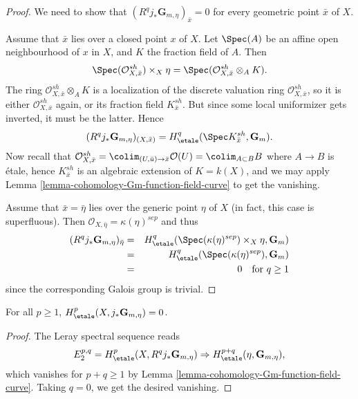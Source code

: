 \begin{proof}
We need to show that $(R^q j_*\mathbf{G}_{m, \eta})_{\bar x} = 0$ for every
geometric point $\bar x$ of $X$.

\medskip\noindent
Assume that $\bar x$ lies over a closed point $x$ of $X$. Let $\Spec(A)$
be an affine open neighbourhood of $x$ in $X$, and $K$ the fraction field
of $A$. Then
$$
\Spec(\mathcal{O}^{sh}_{X, \bar x}) \times_X \eta =
\Spec(\mathcal{O}^{sh}_{X, \bar x} \otimes_A K).
$$
The ring $\mathcal{O}^{sh}_{X, \bar x} \otimes_A K$ is a localization of
the discrete valuation ring $\mathcal{O}^{sh}_{X, \bar x}$, so it is either
$\mathcal{O}^{sh}_{X, \bar x}$ again, or its fraction field
$K^{sh}_{\bar x}$. But since some local uniformizer gets inverted, it must
be the latter. Hence
$$
(R^q j_*\mathbf{G}_{m, \eta})_{(X, \bar x)} = H_\etale^q(\Spec
K^{sh}_{\bar x}, \mathbf{G}_m).
$$
Now recall that $\mathcal{O}^{sh}_{X, \bar x} =
\colim_{(U, \bar u) \to \bar x} \mathcal{O}(U) = \colim_{A \subset B} B$
where $A \to B$ is \'etale, hence $K^{sh}_{\bar x}$ is an algebraic
extension of $K = k(X)$, and we may apply
Lemma \ref{lemma-cohomology-Gm-function-field-curve}
to get the vanishing.

\medskip\noindent
Assume that $\bar x = \bar \eta$ lies over the generic point $\eta$ of $X$ (in
fact, this case is superfluous). Then $\mathcal{O}_{X, \bar \eta} =
\kappa(\eta)^{sep}$ and thus
\begin{eqnarray*}
(R^q j_*\mathbf{G}_{m, \eta})_{\bar \eta}
& = &
H_\etale^q(\Spec(\kappa(\eta)^{sep}) \times_X \eta, \mathbf{G}_m) \\
& = & H_\etale^q (\Spec(\kappa(\eta)^{sep}), \mathbf{G}_m) \\
& = & 0 \ \ \text{ for } q \geq 1
\end{eqnarray*}
since the corresponding Galois group is trivial.
\end{proof}

\begin{lemma}
\label{lemma-cohomology-jstar-Gm}
For all $p \geq 1$, $H_\etale^p(X, j_*\mathbf{G}_{m, \eta}) = 0$.
\end{lemma}

\begin{proof}
The Leray spectral sequence reads
$$
E_2^{p, q} = H_\etale^p(X, R^qj_*\mathbf{G}_{m, \eta}) \Rightarrow
H_\etale^{p+q}(\eta, \mathbf{G}_{m, \eta}),
$$
which vanishes for $p+q \geq 1$ by
Lemma \ref{lemma-cohomology-Gm-function-field-curve}. Taking
$q = 0$, we get the desired vanishing.
\end{proof}

